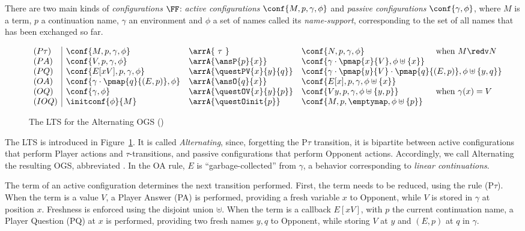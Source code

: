 There are two main kinds of \emph{configurations} $\FF$:
\emph{active configurations} $\conf{M,p,\gamma,\phi}$ and 
\emph{passive configurations}
$\conf{\gamma,\phi}$, where $M$ is a term, $p$ a continuation name, 
$\gamma$ an environment and $\phi$ a set of names called its \emph{name-support},
corresponding to the set of all names that has been exchanged so far.
 

 \begin{figure}
 \[
  \begin{array}{l|llll}
   (P\tau) & \conf{M,p,\gamma,\phi} & \arrA{\ \tau \ } & 
     \conf{N,p,\gamma,\phi} & \text{ when } M \redv N\\
%
   (PA) & \conf{V,p,\gamma,\phi} & \arrA{\ansP{p}{x}} & 
     \conf{\gamma \cdot \pmap{x}{V},\phi \uplus \{x\}} \\
%
   (PQ) & \conf{E[xV],p,\gamma,\phi} & \arrA{\questPV{x}{y}{q}} & 
     \multicolumn{2}{l}{\conf{\gamma \cdot \pmap{y}{V}\cdot \pmap{q}{(E,p)},\phi 
       \uplus \{y,q\}}} \\
%
   (OA) & \conf{\gamma\cdot \pmap{q}{(E,p)},\phi} & \arrA{\ansO{q}{x}} & 
     \conf{E[x],p,\gamma,\phi \uplus \{x\}}\\
%
   (OQ) & \conf{\gamma,\phi} & \arrA{\questOV{x}{y}{p}} & 
     \conf{V y,p,\gamma,\phi \uplus \{y,p\}} & \text{ when } \gamma(x) = V\\
%
   (IOQ) & \initconf{\phi}{M} & \arrA{\questOinit{p}} &
     \conf{M,p,\emptymap,\phi \uplus \{p\}}
  \end{array}\]
 \caption{The  LTS for the  Alternating OGS (\AOGS)}
 \label{fig:seq-ogs-lts}
\end{figure}

The LTS is introduced in Figure~\ref{fig:seq-ogs-lts}.
It is called \emph{Alternating}, since, forgetting the P$\tau$ transition,
it is bipartite between active configurations that perform Player actions and $\tau$-transitions,
and passive configurations that perform Opponent actions.  
Accordingly, we call Alternating the resulting OGS, abbreviated \AOGS. 
In the OA rule, $E$ is ``garbage-collected''  from $\gamma$,
a behavior corresponding to \emph{linear continuations}.

 
The term of an active configuration determines the next transition performed.
First, the term needs to be reduced, using the rule (P$\tau$).
When the term is a value $V$, a Player Answer (PA) is performed,
providing a fresh variable $x$ to Opponent, while $V$ is stored in $\gamma$ at position $x$. 
Freshness is enforced using the disjoint union $\uplus$.
When the term is a callback $E[xV]$, with $p$ the current continuation name,
a Player Question (PQ) at $x$ is performed, providing two fresh names $y,q$
to Opponent, while storing $V$ at $y$ and $(E,p)$ at $q$ in $\gamma$.


